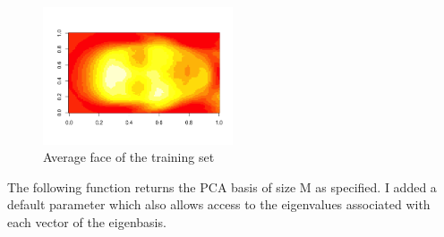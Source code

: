 \documentclass[12pt]{article}
\begin{document}
\newpage
\begin{figure}
\caption{Average face of the training set}
\centering
\includegraphics[width=0.5\textwidth]{average}
\end{figure}

The following function returns the PCA basis of size M as specified. I added a default parameter which also allows access to the eigenvalues associated with each vector of the eigenbasis.

\begin{lstlisting}[linewidth=18.4cm,language=R]
\end{lstlisting}
\end{document}
